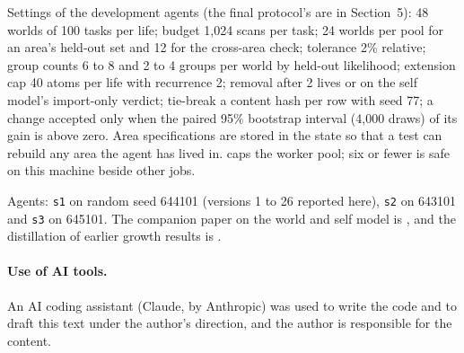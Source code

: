 \documentclass[11pt]{article}
\begin{document}
Settings of the development agents (the final protocol's are in Section~5): 48 worlds of 100 tasks per life; budget 1,024 scans per task; 24 worlds per pool for an area's held-out set and 12 for the cross-area check; tolerance 2\% relative; group counts 6 to 8 and 2 to 4 groups per world by held-out likelihood; extension cap 40 atoms per life with recurrence 2; removal after 2 lives or on the self model's import-only verdict; tie-break a content hash per row with seed 77; a change accepted only when the paired 95\% bootstrap interval (4,000 draws) of its gain is above zero. Area specifications are stored in the state so that a test can rebuild any area the agent has lived in.  caps the worker pool; six or fewer is safe on this machine beside other jobs.

Agents: \texttt{s1} on random seed 644101 (versions 1 to 26 reported here), \texttt{s2} on 643101 and \texttt{s3} on 645101. The companion paper on the world and self model is , and the distillation of earlier growth results is .

\paragraph{Use of AI tools.} An AI coding assistant (Claude, by Anthropic) was used to write the code and to draft this text under the author's direction, and the author is responsible for the content.
\end{document}
